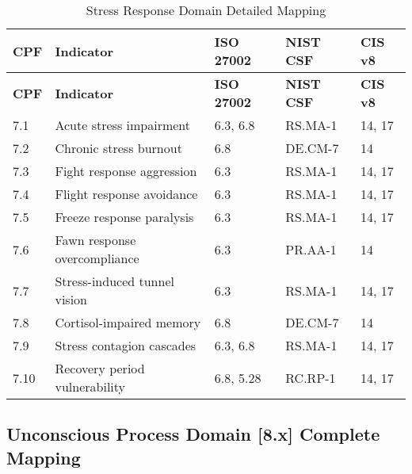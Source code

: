 \documentclass[11pt,a4paper]{article}
\begin{document}
\begin{longtable}{p{1cm}p{4cm}p{2.5cm}p{2.5cm}p{2cm}}
\caption{Stress Response Domain Detailed Mapping} \\
\toprule
\textbf{CPF} & \textbf{Indicator} & \textbf{ISO 27002} & \textbf{NIST CSF} & \textbf{CIS v8} \\
\midrule
\endfirsthead
\toprule
\textbf{CPF} & \textbf{Indicator} & \textbf{ISO 27002} & \textbf{NIST CSF} & \textbf{CIS v8} \\
\midrule
\endhead
\bottomrule
\endlastfoot

7.1 & Acute stress impairment & 6.3, 6.8 & RS.MA-1 & 14, 17 \\
7.2 & Chronic stress burnout & 6.8 & DE.CM-7 & 14 \\
7.3 & Fight response aggression & 6.3 & RS.MA-1 & 14, 17 \\
7.4 & Flight response avoidance & 6.3 & RS.MA-1 & 14, 17 \\
7.5 & Freeze response paralysis & 6.3 & RS.MA-1 & 14, 17 \\
7.6 & Fawn response overcompliance & 6.3 & PR.AA-1 & 14 \\
7.7 & Stress-induced tunnel vision & 6.3 & RS.MA-1 & 14, 17 \\
7.8 & Cortisol-impaired memory & 6.8 & DE.CM-7 & 14 \\
7.9 & Stress contagion cascades & 6.3, 6.8 & RS.MA-1 & 14, 17 \\
7.10 & Recovery period vulnerability & 6.8, 5.28 & RC.RP-1 & 14, 17 \\

\end{longtable}

\subsection{Unconscious Process Domain [8.x] Complete Mapping}
\end{document}
